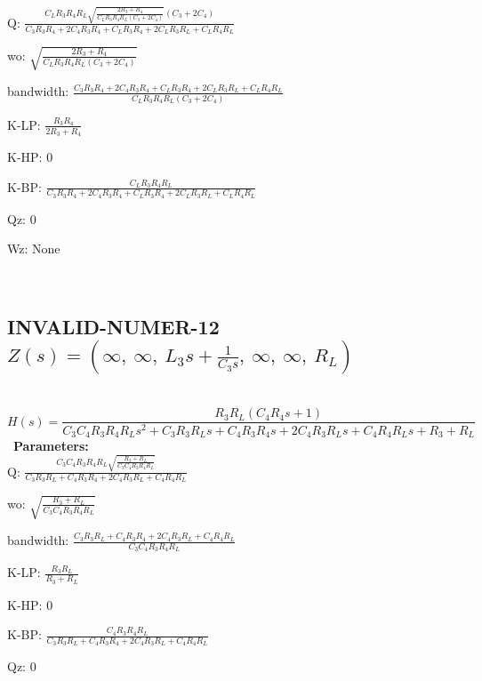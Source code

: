 \documentclass{article}
\begin{document}
Q: $\frac{C_{L} R_{3} R_{4} R_{L} \sqrt{\frac{2 R_{3} + R_{4}}{C_{L} R_{3} R_{4} R_{L} \left(C_{3} + 2 C_{4}\right)}} \left(C_{3} + 2 C_{4}\right)}{C_{3} R_{3} R_{4} + 2 C_{4} R_{3} R_{4} + C_{L} R_{3} R_{4} + 2 C_{L} R_{3} R_{L} + C_{L} R_{4} R_{L}}$\ 

wo: $\sqrt{\frac{2 R_{3} + R_{4}}{C_{L} R_{3} R_{4} R_{L} \left(C_{3} + 2 C_{4}\right)}}$\ 

bandwidth: $\frac{C_{3} R_{3} R_{4} + 2 C_{4} R_{3} R_{4} + C_{L} R_{3} R_{4} + 2 C_{L} R_{3} R_{L} + C_{L} R_{4} R_{L}}{C_{L} R_{3} R_{4} R_{L} \left(C_{3} + 2 C_{4}\right)}$\ 

K-LP: $\frac{R_{3} R_{4}}{2 R_{3} + R_{4}}$\ 

K-HP: $0$\ 

K-BP: $\frac{C_{L} R_{3} R_{4} R_{L}}{C_{3} R_{3} R_{4} + 2 C_{4} R_{3} R_{4} + C_{L} R_{3} R_{4} + 2 C_{L} R_{3} R_{L} + C_{L} R_{4} R_{L}}$\ 

Qz: $0$\ 

Wz: $\text{None}$\ 

\ 

\subsection{INVALID-NUMER-12 $Z(s) = \left( \infty, \  \infty, \  L_{3} s + \frac{1}{C_{3} s}, \  \infty, \  \infty, \  R_{L}\right)$ } \ 
\textbf{\[H(s) = \frac{R_{3} R_{L} \left(C_{4} R_{4} s + 1\right)}{C_{3} C_{4} R_{3} R_{4} R_{L} s^{2} + C_{3} R_{3} R_{L} s + C_{4} R_{3} R_{4} s + 2 C_{4} R_{3} R_{L} s + C_{4} R_{4} R_{L} s + R_{3} + R_{L}}\] } \ 
\textbf{Parameters:}\\ 

Q: $\frac{C_{3} C_{4} R_{3} R_{4} R_{L} \sqrt{\frac{R_{3} + R_{L}}{C_{3} C_{4} R_{3} R_{4} R_{L}}}}{C_{3} R_{3} R_{L} + C_{4} R_{3} R_{4} + 2 C_{4} R_{3} R_{L} + C_{4} R_{4} R_{L}}$\ 

wo: $\sqrt{\frac{R_{3} + R_{L}}{C_{3} C_{4} R_{3} R_{4} R_{L}}}$\ 

bandwidth: $\frac{C_{3} R_{3} R_{L} + C_{4} R_{3} R_{4} + 2 C_{4} R_{3} R_{L} + C_{4} R_{4} R_{L}}{C_{3} C_{4} R_{3} R_{4} R_{L}}$\ 

K-LP: $\frac{R_{3} R_{L}}{R_{3} + R_{L}}$\ 

K-HP: $0$\ 

K-BP: $\frac{C_{4} R_{3} R_{4} R_{L}}{C_{3} R_{3} R_{L} + C_{4} R_{3} R_{4} + 2 C_{4} R_{3} R_{L} + C_{4} R_{4} R_{L}}$\ 

Qz: $0$\ 
\end{document}
